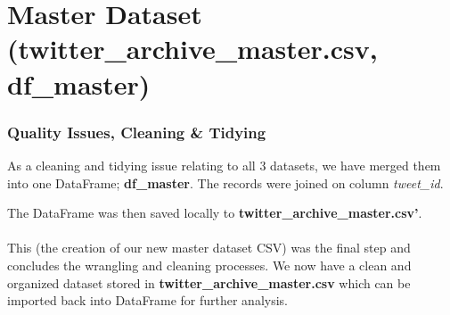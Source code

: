 \documentclass{report}
\begin{document}
\section{Master Dataset (\textbf{twitter\_archive\_master.csv}, \textbf{df\_master})}
	\subsubsection{Quality Issues, Cleaning \& Tidying}
	As a cleaning and tidying issue relating to all 3 datasets, we have merged them into one DataFrame; \textbf{df\_master}. The records were joined on column \textit{tweet\_id}.

	The DataFrame was then saved locally to  \textbf{twitter\_archive\_master.csv'}. \\ \\ 


	This (the creation of our new master dataset CSV) was the final step and concludes the wrangling and cleaning processes. 
	We now have a clean and organized dataset stored in \textbf{twitter\_archive\_master.csv} which can be imported back into DataFrame for
	further analysis. 
\end{document}
